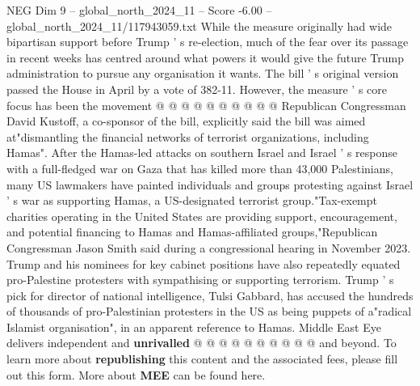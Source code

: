 \begin{textsample}{NEG Dim 9 – global\_north\_2024\_11 – Score -6.00 – global\_north\_2024\_11/117943059.txt}
While the measure originally had wide bipartisan support before Trump ' s re-election, much of the fear over its passage in recent weeks has centred around what powers it would give the future Trump administration to pursue any organisation it wants.
The bill ' s original version passed the House in April by a vote of 382-11.
However, the measure ' s core focus has been the movement @ @ @ @ @ @ @ @ @ @ Republican Congressman David Kustoff, a co-sponsor of the bill, explicitly said the bill was aimed at"dismantling the financial networks of terrorist organizations, including Hamas".
After the Hamas-led attacks on southern Israel and Israel ' s response with a full-fledged war on Gaza that has killed more than 43,000 Palestinians, many US lawmakers have painted individuals and groups protesting against Israel ' s war as supporting Hamas, a US-designated terrorist group."Tax-exempt charities operating in the United States are providing support, encouragement, and potential financing to Hamas and Hamas-affiliated groups,"Republican Congressman Jason Smith said during a congressional hearing in November 2023.
Trump and his nominees for key cabinet positions have also repeatedly equated pro-Palestine protesters with sympathising or supporting terrorism.
Trump ' s pick for director of national intelligence, Tulsi Gabbard, has accused the hundreds of thousands of pro-Palestinian protesters in the US as being puppets of a"radical Islamist organisation", in an apparent reference to Hamas.
Middle East Eye delivers independent and \textbf{unrivalled} @ @ @ @ @ @ @ @ @ @ and beyond.
To learn more about \textbf{republishing} this content and the associated fees, please fill out this form.
More about \textbf{MEE} can be found here.

\end{textsample}
